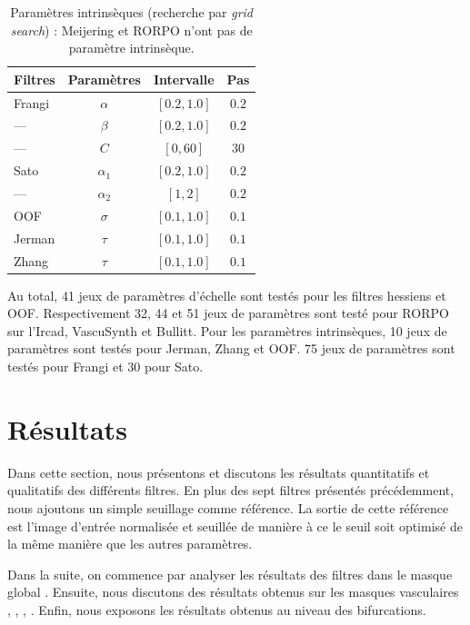 \begin{table}[H]
  \caption{Paramètres intrinsèques (recherche par \textit{grid search}) : Meijering et RORPO n'ont pas de paramètre intrinsèque.}
  \label{table:PS_interval}
  \begin{center}
    \begin{tabular}{  l  c  c  c }
      \hline
      Filtres & Paramètres & Intervalle & Pas \\
      \hline
      Frangi & $\alpha$ & $[0.2,1.0]$ & $0.2$ \\
      ---       & $\beta$ & $[0.2,1.0]$ & $0.2$  \\
      ---       & $C$& $[0,60]$ & $30$ \\
      Sato & $\alpha_{1}$ & $[0.2,1.0]$ & $0.2$ \\
      ---     & $\alpha_{2}$ & $[1,2]$ & $0.2$ \\
      OOF & $\sigma$ & $[0.1,1.0]$ & $0.1$ \\
      Jerman & $\tau$ & $[0.1,1.0]$ & $0.1$ \\
      Zhang & $\tau$& $[0.1,1.0]$ & $0.1$ \\
      \hline
    \end{tabular}
  \end{center}
\end{table}
  
Au total, 41 jeux de paramètres d'échelle sont testés pour les filtres hessiens et OOF. Respectivement 32, 44 et 51 jeux de paramètres sont testé pour RORPO sur l'Ircad, VascuSynth et Bullitt. Pour les paramètres intrinsèques, 10 jeux de paramètres sont testés pour Jerman, Zhang et OOF. 75 jeux de paramètres sont testés pour Frangi et 30 pour Sato.


\section{Résultats}

Dans cette section, nous présentons et discutons les résultats quantitatifs et qualitatifs des différents filtres. En plus des sept filtres présentés précédemment, nous ajoutons un simple seuillage comme référence. La sortie de cette référence est l'image d'entrée normalisée et seuillée de manière à ce le seuil soit optimisé de la même manière que les autres paramètres.

Dans la suite, on commence par analyser les résultats des filtres dans le masque global \maskglobal. Ensuite, nous discutons des résultats obtenus sur les masques vasculaires \maskvascular, \maskvesselLarge, \maskvesselMedium, \maskvesselSmall. Enfin, nous exposons les résultats obtenus au niveau des bifurcations.

